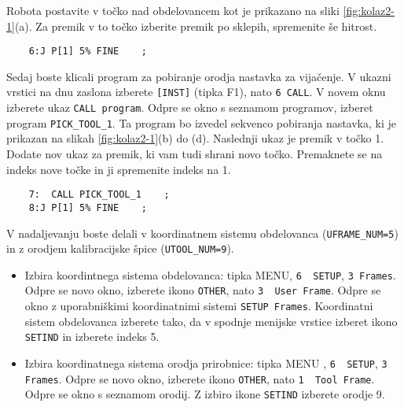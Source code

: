Robota postavite v točko nad obdelovancem kot je prikazano na sliki \ref{fig:kolaz2-1}(a). Za premik v to točko izberite premik po sklepih, spremenite še hitrost. 

\vspace{0.35cm}
\begin{mdframed}[backgroundcolor=orange!20, shadow=true,roundcorner=8pt]
	
	\begin{verbatim}
	6:J P[1] 5% FINE    ;
	\end{verbatim}
	
\end{mdframed}

Sedaj boste klicali program za pobiranje orodja nastavka za vijačenje.  V ukazni vrstici na dnu zaslona izberete \verb|[INST]| (tipka F1), nato \verb*|6 CALL|. V novem oknu izberete ukaz \verb*|CALL program|. Odpre se okno s seznamom programov, izberet program \verb*|PICK_TOOL_1|. Ta program bo izvedel sekvenco pobiranja nastavka, ki je prikazan na slikah \ref{fig:kolaz2-1}(b) do (d). Naslednji ukaz je premik v točko 1. Dodate nov ukaz za premik, ki vam tudi shrani novo točko. Premaknete se na indeks nove točke in ji spremenite indeks na 1.

\vspace{0.35cm}
\begin{mdframed}[backgroundcolor=orange!20, shadow=true,roundcorner=8pt]
	
	\begin{verbatim}
	7:  CALL PICK_TOOL_1    ;
	8:J P[1] 5% FINE    ;
	\end{verbatim}
	
\end{mdframed}

V nadaljevanju boste delali v koordinatnem sistemu obdelovanca (\verb*|UFRAME_NUM=5|) in z orodjem kalibracijske špice (\verb*|UTOOL_NUM=9|). 

\begin{itemize}
	\item Izbira koordintnega sistema obdelovanca:  tipka MENU, \verb|6  SETUP|, \verb|3 Frames|. Odpre se novo okno, izberete ikono \verb|OTHER|, nato \verb|3  User Frame|. Odpre se okno z uporabniškimi koordinatnimi sistemi \verb|SETUP Frames|. Koordinatni sistem obdelovanca izberete tako, da v spodnje menijske vrstice izberet ikono \verb*|SETIND| in izberete indeks 5.
	\item Izbira koordinatnega sistema orodja prirobnice: tipka MENU , \verb|6  SETUP|, \verb|3 Frames|. Odpre se novo okno, izberete ikono \verb|OTHER|, nato \verb|1  Tool Frame|.  Odpre se okno s seznamom orodij. Z izbiro ikone \verb*|SETIND| izberete orodje 9. 
\end{itemize}

